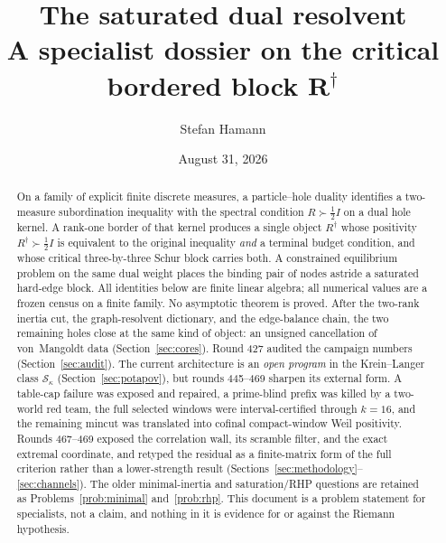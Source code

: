 \documentclass[11pt]{article}
\title{\bfseries The saturated dual resolvent\\[2mm]
\large A specialist dossier on the critical bordered block
$\boldsymbol{R^{\dagger}}$}
\author{Stefan Hamann}
\date{August 31, 2026}
\theoremstyle{remark}
\newcommand{\Rd}{R^{\dagger}}
\newcommand{\half}{\tfrac12}
\newcommand{\Sk}{\mathcal{S}}
\begin{document}
\maketitle

\begin{abstract}\noindent
On a family of explicit finite discrete measures, a particle--hole
duality identifies a two-measure subordination inequality with the
spectral condition $R\succ\half I$ on a dual hole kernel.  A rank-one
border of that kernel produces a single object $\Rd$ whose positivity
$\Rd\succ\half I$ is equivalent to the original inequality
\emph{and} a terminal budget condition, and whose critical
three-by-three Schur block carries both.  A constrained equilibrium
problem on the same dual weight places the binding pair of nodes
astride a saturated hard-edge block.  All identities below are finite
linear algebra; all numerical values are a frozen census on a finite
family.  No asymptotic theorem is proved.  After the two-rank inertia
cut, the graph-resolvent dictionary, and the edge-balance chain,
the two remaining holes close at the same kind of object: an
unsigned cancellation of von~Mangoldt data
(Section~\ref{sec:cores}).  Round 427 audited the campaign
numbers (Section~\ref{sec:audit}).  The current architecture is
an \emph{open program} in the Krein--Langer class $\Sk_{\kappa}$
(Section~\ref{sec:potapov}), but rounds 445--469 sharpen its
external form.  A table-cap failure was exposed and repaired, a
prime-blind prefix was killed by a two-world red team, the full
selected windows were interval-certified through $k=16$, and the
remaining mincut was translated into cofinal compact-window Weil
positivity.  Rounds 467--469 exposed the correlation wall, its
scramble filter, and the exact extremal coordinate, and retyped the
residual as a finite-matrix form of the full criterion rather than
a lower-strength result
(Sections~\ref{sec:methodology}--\ref{sec:channels}).  The
older minimal-inertia and
saturation/RHP questions are retained as
Problems~\ref{prob:minimal} and~\ref{prob:rhp}.  This document is
a problem statement for specialists, not a claim, and nothing in
it is evidence for or against the Riemann hypothesis.
\end{abstract}
\end{document}
